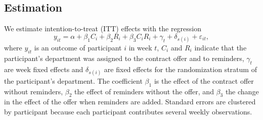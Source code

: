 \subsection{Estimation}
We estimate intention-to-treat (ITT) effects with the regression
\begin{equation}
y_{it} = \alpha + \beta_1 C_i + \beta_2 R_i + \beta_3 C_i R_i + \gamma_t + \delta_{s(i)} + \varepsilon_{it},
\label{eq:main}
\end{equation}
where $y_{it}$ is an outcome of participant $i$ in week $t$, $C_i$ and $R_i$ indicate that the participant's department was assigned to the contract offer and to reminders, $\gamma_t$ are week fixed effects and $\delta_{s(i)}$ are fixed effects for the randomization stratum of the participant's department. The coefficient $\beta_1$ is the effect of the contract offer without reminders, $\beta_2$ the effect of reminders without the offer, and $\beta_3$ the change in the effect of the offer when reminders are added. Standard errors are clustered by participant because each participant contributes several weekly observations.
